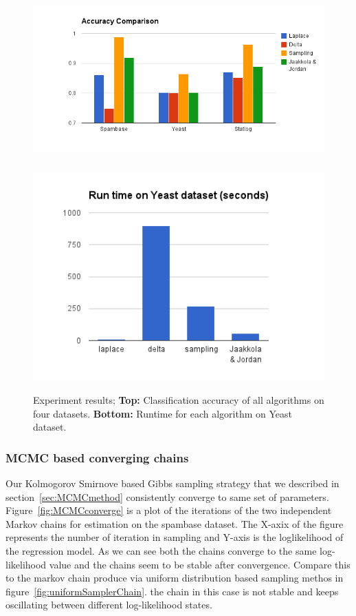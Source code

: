 \begin{figure}[t]
\centering
\includegraphics[height=7.0cm]{results/accuracy_comp.png}
\includegraphics[height=8.0cm]{results/speed_comp.png}

\caption{\small Experiment results; {\bf Top:} Classification accuracy of all algorithms on
four datasets. {\bf Bottom:} Runtime for each algorithm on Yeast dataset. }
\label{fig:results}
\end{figure}

\subsubsection{MCMC based converging chains}

Our Kolmogorov Smirnove based Gibbs sampling strategy that we described in
section~\ref{sec:MCMCmethod} consistently converge to same set of parameters.
Figure~\ref{fig:MCMCconverge} is a plot of the iterations of the two
independent Markov chains for estimation on the spambase dataset.  The X-axix
of the figure represents the number of iteration in sampling and Y-axis is the
loglikelihood of the regression model.  As we can see both the chains converge
to the same log-likelihood value and the chains seem to be stable after
convergence. Compare this to the markov chain produce via uniform distribution
based sampling methos in figure~\ref{fig:uniformSamplerChain}. the chain in
this case is not stable and keeps oscillating between different log-likelihood
states. 
 

